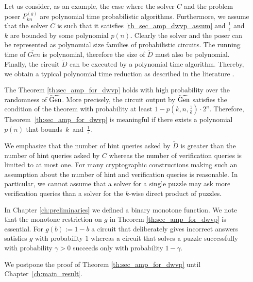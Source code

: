 Let us consider, as an example, the case where the solver $C$ and the problem poser $P_{kn}^{(g)}$ are polynomial time probabilistic algorithms.
Furthermore, we assume that the solver $C$ is such that it satisfies \eqref{th_sec_amp_dwvp_assum}
and $\frac{1}{\epsilon}$ and $k$ are bounded by some polynomial $p(n)$.
Clearly the solver and the poser can be represented as polynomial size families of probabilistic circuits.
The running time of $\widetilde{Gen}$ is polynomial, therefore the size of $\widetilde{D}$ must also be polynomial.
Finally, the circuit $\widetilde{D}$ can be executed by a polynomial time algorithm.
Thereby, we obtain a typical polynomial time reduction as described in the literature \cite{Arora:2009:CCM:1540612, LectureNotesCrypo}.

The Theorem \ref{th:sec_amp_for_dwvp} holds with high probability over the randomness of $\widetilde{\operatorname{\text{Gen}}}$.
More precisely, the circuit output by $\widetilde{\operatorname{\text{Gen}}}$ satisfies the condition of the theorem with probability
at least $1 - p(k, n, \frac{1}{\epsilon}) \cdot 2^n$. Therefore, Theorem~\ref{th:sec_amp_for_dwvp} is meaningful if there exists a polynomial $p(n)$
that bounds~$k$~and~$\frac{1}{\epsilon}$.

We emphasize that the number of hint queries asked by $\widetilde{D}$ is greater than the number of hint queries asked by $C$ whereas the number of verification queries
is limited to at most one. For many cryptographic constructions making such an assumption about the number of hint and verification queries is reasonable.
In particular, we cannot assume that a solver for a single puzzle may ask more verification queries than a solver for the $k$-wise direct product of puzzles.

In Chapter \ref{ch:preliminaries} we defined a binary monotone function.
We note that the monotone restriction on $g$ in Theorem \ref{th:sec_amp_for_dwvp} is essential. For $g(b) := 1 - b$ a circuit that deliberately gives incorrect
answers satisfies $g$ with probability $1$ whereas a circuit that solves a puzzle successfully with probability
$\gamma > 0$ succeeds only with probability $1 - \gamma$.

We postpone the proof of Theorem \ref{th:sec_amp_for_dwvp} until Chapter~\ref{ch:main_result}.

